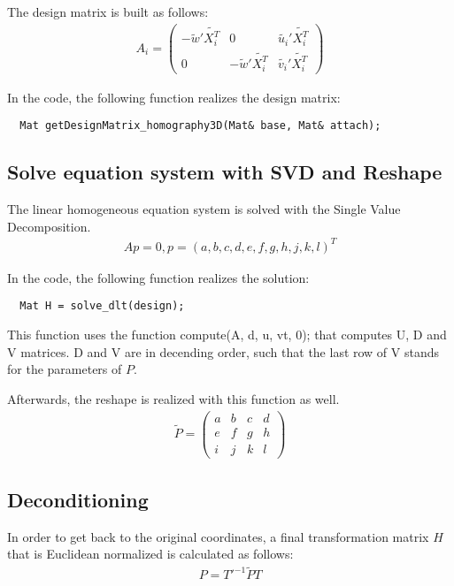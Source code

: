 \documentclass[a4paper,headings=small]{scrartcl}
\numberwithin{equation}{section} %
\numberwithin{figure}{section}   %
\begin{document}
  The design matrix is built as follows: \\
  \begin{align}
  A_{i}=
  \left( \begin{array}{ccc}
  -\tilde{w}'\tilde{X_i^T} & 0 & \tilde{u_i}'\tilde{X_i^T} \\
  0 & -\tilde{w}'\tilde{X_i^T} & \tilde{v_i}'\tilde{X_i^T}
  \end{array} \right) 
  \end{align}

  In the code, the following function realizes the design matrix:
  \begin{lstlisting}
  Mat getDesignMatrix_homography3D(Mat& base, Mat& attach);
  \end{lstlisting}

  \subsection{Solve equation system with SVD and Reshape}

  The linear homogeneous equation system is solved with the Single Value Decomposition.
  \begin{align}
  Ap=0, p=(a,b,c,d,e,f,g,h,j,k,l)^T 
  \end{align}

  In the code, the following function realizes the solution:
  \begin{lstlisting}
  Mat H = solve_dlt(design);
  \end{lstlisting}

  This function uses the function compute(A, d, u, vt, 0); that computes U, D and V matrices.
  D and V are in decending order, such that the last row of V stands for the parameters of $P$. 

  Afterwards, the reshape is realized with this function as well.
  \begin{align}
  \tilde{P}=
  \left( \begin{array}{cccc}
  a & b & c & d \\
  e & f & g & h \\ 
  i & j & k & l
  \end{array} \right)
  \end{align}

  \subsection{Deconditioning}
In order to get back to the original coordinates, a final transformation matrix $H$ 
that is Euclidean normalized is calculated as follows:
\begin{align}
P=T'^{-1}\tilde{P}T
\end{align}
\end{document}
